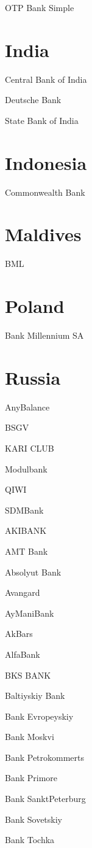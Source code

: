 \documentclass[a4paper,10pt,english]{sphinxmanual}
\begin{document}
OTP Bank  Simple


\section{India}
\label{\detokenize{banks:india}}
Central Bank of India

Deutsche Bank

State Bank of India


\section{Indonesia}
\label{\detokenize{banks:indonesia}}
Commonwealth Bank


\section{Maldives}
\label{\detokenize{banks:maldives}}
BML


\section{Poland}
\label{\detokenize{banks:poland}}
Bank Millennium SA


\section{Russia}
\label{\detokenize{banks:russia}}
AnyBalance

BSGV

KARI CLUB

Modulbank

QIWI

SDMBank

AKIBANK

AMT Bank

Absolyut Bank

Avangard

AyManiBank

AkBars

AlfaBank

BKS BANK

Baltiyskiy Bank

Bank Evropeyskiy

Bank Moskvi

Bank Petrokommerts

Bank Primore

Bank SanktPeterburg

Bank Sovetskiy

Bank Tochka
\end{document}
